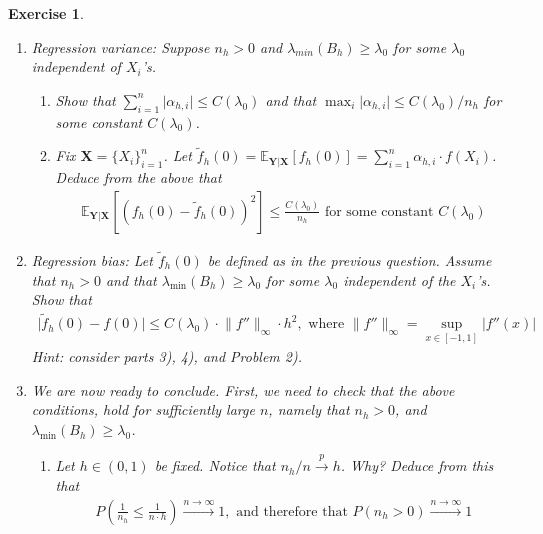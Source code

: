 \documentclass[12pt]{article}
\theoremstyle{colon}
\newtheorem{exercise}{Exercise}
\begin{document}
\begin{exercise}
\begin{enumerate}[label=\arabic*)]
    \item Regression variance:
      Suppose $n_h > 0$ and $\lambda_{min}(B_h) \geq \lambda_0$ for some $\lambda_0$ independent of $X_i$'s.
      \begin{enumerate}[label=\alph*)]
        \item Show that $\sum_{i=1}^n \lvert \alpha_{h,i} \rvert \leq C(\lambda_0)$ and that $\max_i \lvert \alpha_{h,i} \rvert \leq C(\lambda_0)/n_h$ for some constant $C(\lambda_0)$.
        \item Fix $\textbf{X} = \{ X_i \}_{i=1}^n$. Let $\tilde{f}_h(0) = \mathbb{E}_{\textbf{Y} | \textbf{X} } [f_h(0)] = \sum_{i=1}^n \alpha_{h,i} \cdot f(X_i)$. Deduce from the above that
          \begin{gather*}
            \mathbb{E}_{\textbf{Y} | \textbf{X} } [(f_h(0) - \tilde{f}_h(0))^2] \leq \frac{C(\lambda_0)}{n_h} \text{ for some constant } C(\lambda_0)
          \end{gather*}
      \end{enumerate}

    \item Regression bias:
      Let $\tilde{f}_h(0)$ be defined as in the previous question. Assume that $n_h > 0$ and that $\lambda_{\min}(B_h) \geq \lambda_0$ for some $\lambda_0$ independent of the $X_i$'s. Show that
      \begin{gather*}
        \lvert \tilde{f}_h(0) - f(0) \rvert \leq C(\lambda_0) \cdot \lVert f'' \rVert_\infty \cdot h^2, \text{ where } \lVert f'' \rVert_\infty = \sup_{x \in [-1,1]} \lvert f''(x) \rvert
      \end{gather*}
      Hint: consider parts 3), 4), and Problem 2).

    \item We are now ready to conclude. First, we need to check that the above conditions, hold for sufficiently large $n$, namely that $n_h > 0$, and $\lambda_{\min}(B_h) \geq \lambda_0$.
      \begin{enumerate}[label=\alph*)]
        \item Let $h \in (0,1)$ be fixed. Notice that $n_h/n \xrightarrow{p} h$. Why? Deduce from this that
          \begin{gather*}
            P \left( \frac{1}{n_h} \leq \frac{1}{n \cdot h} \right) \xrightarrow{n \rightarrow \infty} 1, \text{ and therefore that } P(n_h > 0) \xrightarrow{n \rightarrow \infty} 1
          \end{gather*}


\end{enumerate}
\end{enumerate}
\end{exercise}
\end{document}
